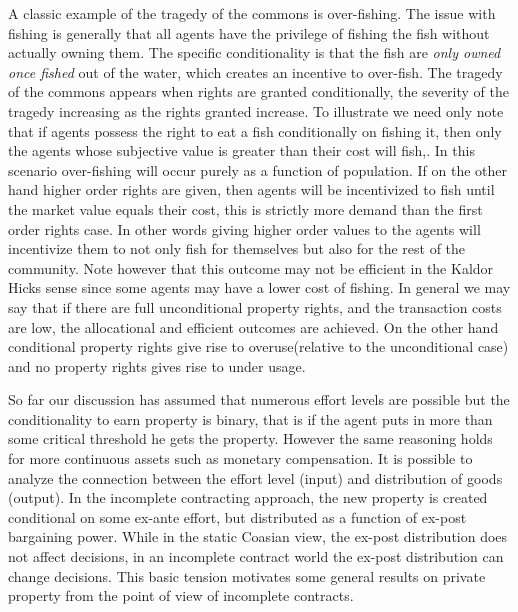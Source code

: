 \documentclass[12pt]{report}
\numberwithin{equation}{section}
\begin{document}
A classic example of the tragedy of the commons is over-fishing. The issue with fishing is generally that all agents have the privilege of fishing the fish without actually owning them. The specific conditionality is that the fish are \textit{only owned once fished} out of the water, which creates an incentive to over-fish. The tragedy of the commons appears when rights are granted conditionally, the severity of the tragedy increasing as the rights granted increase. To illustrate we need only note that if agents possess the right to eat a fish conditionally on fishing it, then only the agents whose subjective value is greater than their cost will fish,. In this scenario over-fishing will occur purely as a function of population. If on the other hand higher order rights are given, then agents will be incentivized to fish until the market value equals their cost, this is strictly more demand than the first order rights case. In other words giving higher order values to the agents will incentivize them to not only fish for themselves but also for the rest of the community. Note however that this outcome may not be efficient in the Kaldor Hicks sense since some agents may have a lower cost of fishing.  In general we may say that if there are full unconditional property rights, and the transaction costs are low, the allocational and efficient outcomes are achieved. On the other hand conditional property rights give rise to overuse(relative to the unconditional case) and no property rights gives rise to under usage.

So far our discussion has assumed that numerous effort levels are possible but the conditionality to earn property is binary, that is if the agent puts in more than some critical threshold he gets the property. However the same reasoning holds for more continuous assets such as monetary compensation. It is possible to analyze the connection between the effort level (input) and distribution of goods (output). In the incomplete contracting approach, the new property is created conditional on some ex-ante effort, but distributed as a function of ex-post bargaining power. While in the static Coasian view, the ex-post distribution does not affect decisions, in an incomplete contract world the ex-post distribution can change decisions. This basic tension motivates some general results on private property from the point of view of incomplete contracts.
\end{document}
